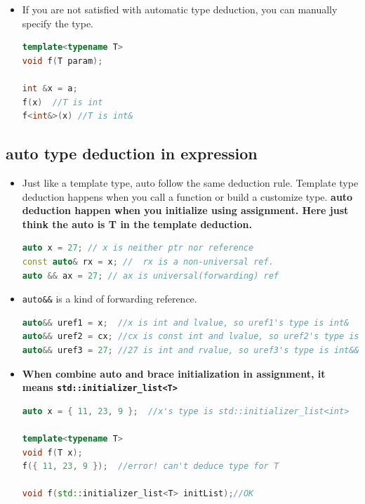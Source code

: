 \documentclass[a4paper,11pt,twoside]{book}
\begin{document}
\begin{itemize}
	\item If you are not satisfied with automatic type deduction, you can manually specify the type.  
\begin{lstlisting}[frame=single, language=c++]
template<typename T>
void f(T param); 
	
int &x = a;
f(x)  //T is int
f<int&>(x) //T is int&
\end{lstlisting}

\end{itemize}
	
\subsection{auto type deduction in expression}
\begin{itemize}
	\item Just like a template type, auto follow the same deduction rule. Template type deduction happens when you call a function or build a customize type. \textbf{auto deduction happen when you initialize using assignment. Here just think the auto is T in the template deduction.}
	
\begin{lstlisting}[frame=single, language=c++]
auto x = 27; // x is neither ptr nor reference
const auto& rx = x; //  rx is a non-universal ref.
auto && ax = 27; // ax is universal(forwarding) ref
\end{lstlisting}

    \item \texttt{auto\&\&} is a kind of forwarding reference.
\begin{lstlisting}[frame=single, language=c++]
auto&& uref1 = x;  //x is int and lvalue, so uref1's type is int&
auto&& uref2 = cx; //cx is const int and lvalue, so uref2's type is const int&
auto&& uref3 = 27; //27 is int and rvalue, so uref3's type is int&&
\end{lstlisting}

	\item \textbf{When combine auto and brace initialization in assignment, it means \texttt{std::initializer\_list<T>}}
	
\begin{lstlisting}[frame=single, language=c++]
auto x = { 11, 23, 9 };  //x's type is std::initializer_list<int>

template<typename T>  
void f(T x);
f({ 11, 23, 9 });  //error! can't deduce type for T
	
void f(std::initializer_list<T> initList);//OK
\end{lstlisting}


\end{itemize}
\end{document}
